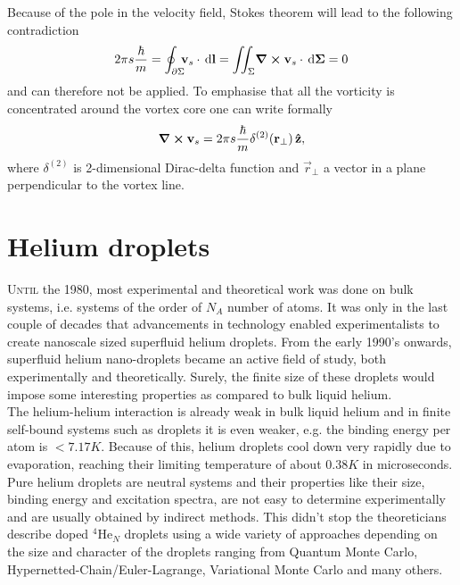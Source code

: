 			Because of the pole in the velocity field, Stokes theorem will lead to the following contradiction
			\begin{align}
				2\pi s\frac{\hbar}{m}=\oint_{\partial\Sigma}\!\!\!\bm{\mathrm{v}}_s\cdot\,\mathrm{d}\bm{\mathrm{l}} = \iint_{\Sigma}\!\curl{\bm{\mathrm{v}}_s}\cdot\,\mathrm{d}\bm{\mathrm{\Sigma}} = 0
			\end{align}
			and can therefore not be applied. To emphasise that all the vorticity is concentrated around the vortex core one can write formally
			\begin{align}
				\curl{\bm{\mathrm{v}}_s} = 2\pi s\frac{\hbar}{m}\delta^{(2)}(\bm{\mathrm{r}}_\perp)\,\vu{z},
			\end{align}
			where $\delta^{(2)}$ is 2-dimensional Dirac-delta function and $\vec{r}_\perp$ a vector in a plane perpendicular to the vortex line.\\

	\section{Helium droplets}
		\lettrine[lines=3,findent=3pt,nindent=0pt]{U}{ntil} the 1980, most experimental and theoretical work was done on bulk systems, i.e. systems of the order of $N_A$ number of atoms. It was only in the last couple of decades that advancements in technology enabled experimentalists to create nanoscale sized superfluid helium droplets. From the early 1990's onwards, superfluid helium nano-droplets became an active field of study, both experimentally and theoretically. Surely, the finite size of these droplets would impose some interesting properties as compared to bulk liquid helium.\\
		
		The helium-helium interaction is already weak in bulk liquid helium and in finite self-bound systems such as droplets it is even weaker, e.g. the binding energy per atom is $<\!7.17\unit{K}$. Because of this, helium droplets cool down very rapidly due to evaporation, reaching their limiting temperature of about $0.38\unit{K}$ in microseconds. Pure helium droplets are neutral systems and their properties like their size, binding energy and excitation spectra, are not easy to determine experimentally and are usually obtained by indirect methods. This didn't stop the theoreticians describe doped $^4$He$_N$ droplets using a wide variety of approaches depending on the size and character of the droplets ranging from Quantum Monte Carlo, Hypernetted-Chain/Euler-Lagrange, Variational Monte Carlo and many others.\\
	
